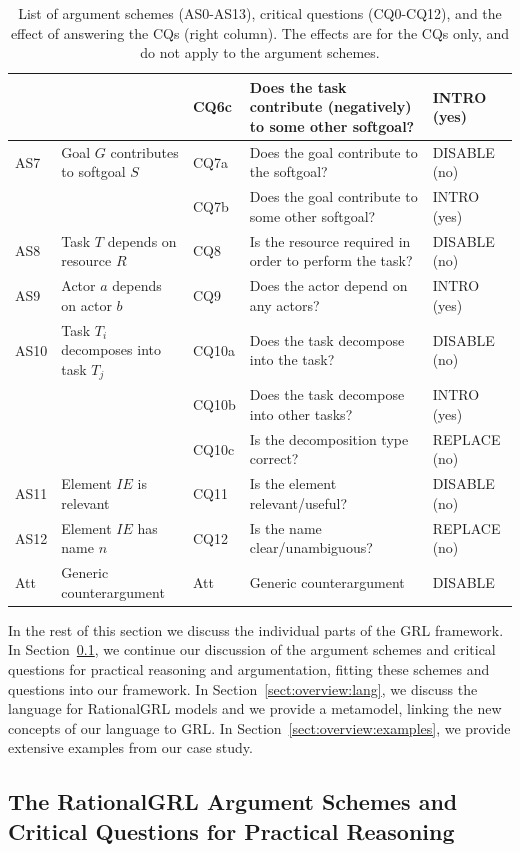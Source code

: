 \begin{table}[t]
\begin{tabularx}{\textwidth}{|l|l|l|X|l|}
&& CQ6c & Does the task contribute (negatively) to some other softgoal?& \textsf{INTRO} (yes)\\
\hline
AS7 & Goal $G$ contributes to softgoal $S$ & CQ7a & Does the goal contribute to the softgoal?& \textsf{DISABLE} (no)\\
&& CQ7b & Does the goal contribute to some other softgoal?& \textsf{INTRO} (yes)\\
\hline
AS8 & Task $T$ depends on resource $R$ & CQ8 & Is the resource required in order to perform the task?& \textsf{DISABLE} (no)\\
\hline
AS9 & Actor $a$ depends on actor $b$ & CQ9 & Does the actor depend on any actors?& \textsf{INTRO} (yes)\\
\hline
AS10 & Task $T_i$ decomposes into task $T_j$ & CQ10a & Does the task decompose into the task? & \textsf{DISABLE} (no)\\
 &  & CQ10b & Does the task decompose into other tasks?& \textsf{INTRO} (yes)\\
 &  & CQ10c & Is the decomposition type correct? & \textsf{REPLACE} (no)\\
\hline
AS11 & Element $IE$ is relevant & CQ11 & Is the element relevant/useful? & \textsf{DISABLE} (no)\\
\hline
AS12 & Element $IE$ has name $n$ & CQ12 & Is the name clear/unambiguous? & \textsf{REPLACE} (no)\\
\hline
\hline
Att & Generic counterargument & Att & Generic counterargument & \textsf{DISABLE}\\
\hline
\end{tabularx}
\caption{List of argument schemes (AS0-AS13), critical questions (CQ0-CQ12), and the effect of answering the CQs (right column). The effects are for the CQs only, and do not apply to the argument schemes.}
\label{table:argument-schemes}
\end{table}

In the rest of this section we discuss the individual parts of the GRL framework. In Section~\ref{sect:overview:as}, we continue our discussion of the argument schemes and critical questions for practical reasoning and argumentation, fitting these schemes and questions into our framework. In Section~\ref{sect:overview:lang}, we discuss the language for RationalGRL models and we provide a metamodel, linking the new concepts of our language to GRL. In Section~\ref{sect:overview:examples}, we provide extensive examples from our case study.  

\subsection{The RationalGRL Argument Schemes and Critical Questions for Practical Reasoning}
\label{sect:overview:as}

